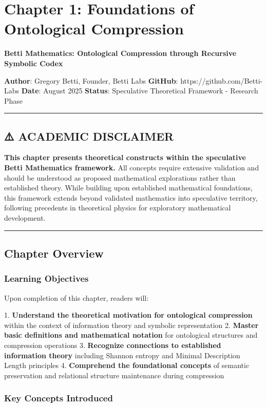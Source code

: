 \chapter{Chapter 1: Foundations of Ontological Compression}

\textbf{Betti Mathematics: Ontological Compression through Recursive Symbolic Codex}

\textbf{Author}: Gregory Betti, Founder, Betti Labs  
\textbf{GitHub}: https://github.com/Betti-Labs  
\textbf{Date}: August 2025  
\textbf{Status}: Speculative Theoretical Framework - Research Phase

\hrule

\section{⚠️ ACADEMIC DISCLAIMER}

\textbf{This chapter presents theoretical constructs within the speculative Betti Mathematics framework.} All concepts require extensive validation and should be understood as proposed mathematical explorations rather than established theory. While building upon established mathematical foundations, this framework extends beyond validated mathematics into speculative territory, following precedents in theoretical physics for exploratory mathematical development.

\hrule

\section{Chapter Overview}

\subsection{Learning Objectives}

Upon completion of this chapter, readers will:

1. \textbf{Understand the theoretical motivation for ontological compression} within the context of information theory and symbolic representation
2. \textbf{Master basic definitions and mathematical notation} for ontological structures and compression operations
3. \textbf{Recognize connections to established information theory} including Shannon entropy and Minimal Description Length principles
4. \textbf{Comprehend the foundational concepts} of semantic preservation and relational structure maintenance during compression

\subsection{Key Concepts Introduced}

